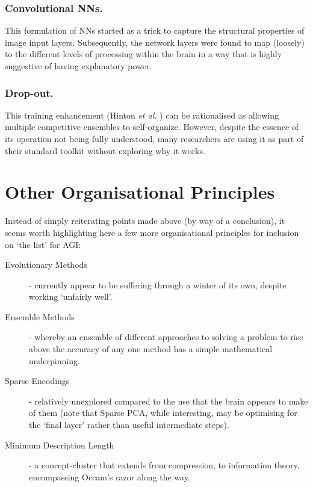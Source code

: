 \documentclass[citeauthoryear]{llncs}
\begin{document}
\subsubsection*{Convolutional NNs.}
This formulation of NNs started as a trick to capture 
the structural properties of image input layers.  
Subsequently, the network layers were found to map (loosely) 
to the different levels of processing within the brain in a way that is highly suggestive 
of having explanatory power.

\subsubsection*{Drop-out.}
This training enhancement (Hinton \emph{et al.} \cite{hinton-dropout}) 
can be rationalised as allowing multiple competitive ensembles to self-organize.  
However, despite the essence of its operation not being fully understood, 
many researchers are using it as part of their standard toolkit without 
exploring why it works.


\section{Other Organisational Principles}

Instead of simply reiterating points made above (by way of a conclusion), 
it seems worth highlighting here a few more organisational principles
for inclusion on `the list' for AGI:

\begin{description}
\item[Evolutionary Methods] - currently appear to be suffering through 
a winter of its own, despite working `unfairly well'.
\item[Ensemble Methods] - whereby an ensemble of different approaches to 
solving a problem to rise above the accuracy 
of any one method has a simple mathematical underpinning.  
\item[Sparse Encodings] - relatively unexplored compared to the use that 
the brain appears to make of them (note that Sparse PCA, while interesting, 
may be optimising for the `final layer' rather than useful intermediate steps).
\item[Minimum Description Length] - a concept-cluster that extends from compression, 
to information theory, encompassing Occam's razor along the way.
\end{description}

\end{document}
